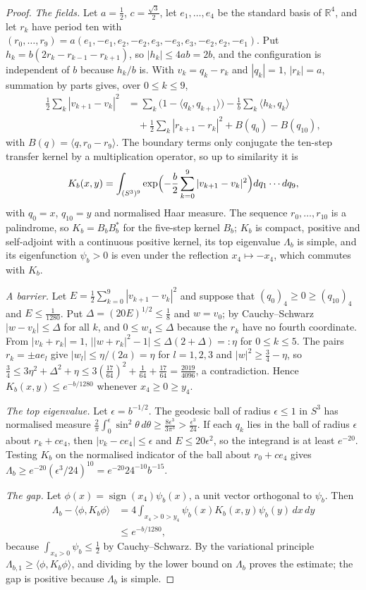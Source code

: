 \documentclass[aps,prd,twocolumn,superscriptaddress,nofootinbib,longbibliography,floatfix,amsmath,amssymb,10pt]{revtex4-2}
\theoremstyle{definition}
\theoremstyle{remark}
\newcommand{\R}{\mathbb{R}}
\newcommand{\ip}[2]{\langle #1,#2\rangle}
\begin{document}
\begin{proof}
\emph{The fields.} Let $a=\frac12$, $c=\frac{\sqrt3}2$, let $e_1,\dots,e_4$ be
the standard basis of $\R^4$, and let $r_k$ have period ten with
$(r_0,\dots,r_9)=a(e_1,-e_1,e_2,-e_2,e_3,-e_3,e_3,-e_2,e_2,-e_1)$. Put
$h_k=b(2r_k-r_{k-1}-r_{k+1})$, so $|h_k|\le4ab=2b$, and the configuration is
independent of $b$ because $h_k/b$ is. With $v_k=q_k-r_k$ and
$|q_k|=1$, $|r_k|=a$, summation by parts gives, over $0\le k\le9$,
\[
\begin{split}
\frac12\sum_k|v_{k+1}-v_k|^2&=\sum_k\bigl(1-\ip{q_k}{q_{k+1}}\bigr)
-\frac1b\sum_k\ip{h_k}{q_k}\\
&\quad+\frac12\sum_k|r_{k+1}-r_k|^2+B(q_0)-B(q_{10}),
\end{split}
\]
with $B(q)=\ip q{r_0-r_9}$. The boundary terms only conjugate the ten-step
transfer kernel by a multiplication operator, so up to similarity it is
\[
K_b(x,y)=\int_{(S^3)^9}\exp\Bigl(-\frac b2\sum_{k=0}^9|v_{k+1}-v_k|^2\Bigr)
dq_1\cdots dq_9,
\]
with $q_0=x$, $q_{10}=y$ and normalised Haar measure. The sequence $r_0,\dots,r_{10}$ is a
palindrome, so $K_b=B_bB_b^*$ for the five-step kernel $B_b$; $K_b$ is
compact, positive and self-adjoint with a continuous positive kernel, its top
eigenvalue $\Lambda_b$ is simple, and its eigenfunction $\psi_b>0$ is even
under the reflection $x_4\mapsto-x_4$, which commutes with $K_b$.

\emph{A barrier.} Let $E=\frac12\sum_{k=0}^9|v_{k+1}-v_k|^2$ and suppose
that $(q_0)_4\ge0\ge(q_{10})_4$ and $E\le\frac1{1280}$. Put $\Delta=
(20E)^{1/2}\le\frac18$ and $w=v_0$; by Cauchy--Schwarz $|w-v_k|\le\Delta$ for
all $k$, and $0\le w_4\le\Delta$ because the $r_k$ have no fourth coordinate.
From $|v_k+r_k|=1$, $\bigl||w+r_k|^2-1\bigr|\le\Delta(2+\Delta)=:\eta$ for
$0\le k\le5$. The pairs $r_k=\pm ae_l$ give $|w_l|\le\eta/(2a)=\eta$ for
$l=1,2,3$ and $|w|^2\ge\frac34-\eta$, so $\frac34\le3\eta^2+\Delta^2+\eta\le
3(\frac{17}{64})^2+\frac1{64}+\frac{17}{64}=\frac{2019}{4096}$, a contradiction.
Hence $K_b(x,y)\le e^{-b/1280}$ whenever $x_4\ge0\ge y_4$.

\emph{The top eigenvalue.} Let $\epsilon=b^{-1/2}$. The geodesic ball of
radius $\epsilon\le1$ in $S^3$ has normalised measure $\frac2\pi\int_0^\epsilon
\sin^2\theta\,d\theta\ge\frac{8\epsilon^3}{3\pi^3}>\frac{\epsilon^3}{24}$. If
each $q_k$ lies in the ball of radius $\epsilon$ about $r_k+ce_4$, then
$|v_k-ce_4|\le\epsilon$ and $E\le20\epsilon^2$, so the integrand is at least
$e^{-20}$. Testing $K_b$ on the normalised indicator of the ball about
$r_0+ce_4$ gives $\Lambda_b\ge e^{-20}(\epsilon^3/24)^{10}=e^{-20}24^{-10}
b^{-15}$.

\emph{The gap.} Let $\phi(x)=\operatorname{sign}(x_4)\psi_b(x)$, a unit vector
orthogonal to $\psi_b$. Then
\[
\begin{split}
\Lambda_b-\ip\phi{K_b\phi}&=4\int_{x_4>0>y_4}\psi_b(x)K_b(x,y)\psi_b(y)\,dx\,dy\\
&\le e^{-b/1280},
\end{split}
\]
because $\int_{x_4>0}\psi_b\le\frac12$ by Cauchy--Schwarz. By the
variational principle $\Lambda_{b,1}\ge\ip\phi{K_b\phi}$, and dividing by the
lower bound on $\Lambda_b$ proves the estimate; the gap is positive because
$\Lambda_b$ is simple.
\end{proof}
\end{document}
